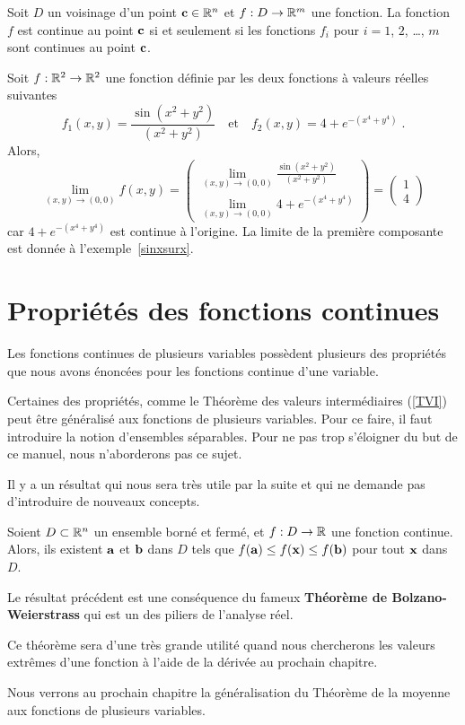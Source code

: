 {\begin{focus}{\prp}
Soit $D$ un voisinage d'un point $\mathbf{c} \in \mathbb{R}^n$ et
$f:D\rightarrow \mathbb{R}^m$ une fonction.  La fonction $f$ est continue au
point $\mathbf{c}$ si et seulement si les fonctions $f_i$ pour $i=1$,
$2$, \ldots, $m$ sont continues au point $\mathbf{c}$.
\end{focus}

\begin{egg}
Soit $f:\mathbb{R}^2 \rightarrow \mathbb{R}^2$ une fonction définie par les deux
fonctions à valeurs réelles suivantes
\[
f_1(x,y) = \frac{\sin(x^2+y^2)}{(x^2+y^2)}
\quad \text{et} \quad
f_2(x,y) = 4 + e^{-(x^4+y^4)} \; .
\]
Alors,
\[
\lim_{(x,y)\rightarrow (0,0)} f(x,y) =
\begin{pmatrix}
\displaystyle \lim_{(x,y)\rightarrow (0,0)}
\frac{\sin(x^2+y^2)}{(x^2+y^2)} \\[1em]
\displaystyle \lim_{(x,y)\rightarrow (0,0)}
4 + e^{-(x^4+y^4)}
\end{pmatrix}
= \begin{pmatrix} 1 \\ 4 \end{pmatrix}
\]
car $4 + e^{-(x^4+y^4)}$ est continue à l'origine.  La limite de la
première composante est donnée à l'exemple~\ref{sinxsurx}.
\end{egg}

\section{Propriétés des fonctions continues \eng}

Les fonctions continues de plusieurs variables possèdent plusieurs
des propriétés que nous avons énoncées pour les fonctions continue
d'une variable.

Certaines des propriétés, comme le Théorème des valeurs intermédiaires
(\ref{TVI}) peut être généralisé aux fonctions de plusieurs
variables.  Pour ce faire, il faut introduire la notion
d'ensembles séparables.  Pour ne pas trop s'éloigner du but de ce
manuel, nous n'aborderons pas ce sujet.

Il y a un résultat qui nous sera très utile par la suite et qui ne
demande pas d'introduire de nouveaux concepts.

\begin{focus}{\thm}\label{TVEnD}
Soient $D \subset \mathbb{R}^n$ un ensemble borné et fermé, et $f:D \to \mathbb{R}$
une fonction continue.  Alors, ils existent $\mathbf{a}$ et $\mathbf{b}$
dans $D$ tels que $f(\mathbf{a}) \leq f(\mathbf{x}) \leq f(\mathbf{b})$ pour
tout $\mathbf{x}$ dans $D$.
\end{focus}

Le résultat précédent est une conséquence du fameux
{\bfseries Théorème de Bolzano-Weier\-strass} qui est un des piliers de
l'analyse réel.

Ce théorème sera d'une très grande utilité quand nous chercherons les
valeurs extrêmes d'une fonction à l'aide de la dérivée au prochain
chapitre.

Nous verrons au prochain chapitre la généralisation du Théorème de la
moyenne aux fonctions de plusieurs variables.

}  %

